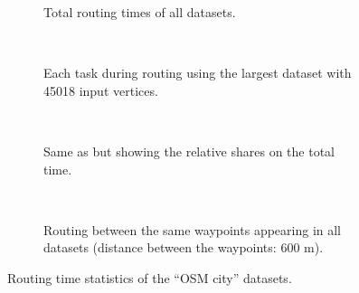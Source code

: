 			\clearpage
			\begin{figure}[h!]
				\begin{figcenter}
					\begin{subfigure}[t]{\textwidth}
						\begin{figcenter}
							
						\end{figcenter}
						\caption{Total routing times of all datasets.}
						\label{fig:eval-city-routing-details-a}
					\end{subfigure}
					\\[3ex]
					\begin{subfigure}[t]{\textwidth}
						\begin{figcenter}
							
						\end{figcenter}
						\caption{Each task during routing using the largest dataset with 45018 input vertices.}
						\label{fig:eval-city-routing-details-b}
					\end{subfigure}
					\\[3ex]
					\begin{subfigure}[t]{\textwidth}
						\begin{figcenter}
							
						\end{figcenter}
						\caption{Same as  but showing the relative shares on the total time.}
					\end{subfigure}
					\\[3ex]
					\begin{subfigure}[t]{\textwidth}
						\begin{figcenter}
							
						\end{figcenter}
						\caption{Routing between the same waypoints appearing in all datasets (distance between the waypoints: 600 m).}
					\end{subfigure}
				\end{figcenter}
				\caption{Routing time statistics of the \enquote{OSM city} datasets.}
				\label{fig:eval-city-routing-details}
			\end{figure}
			
